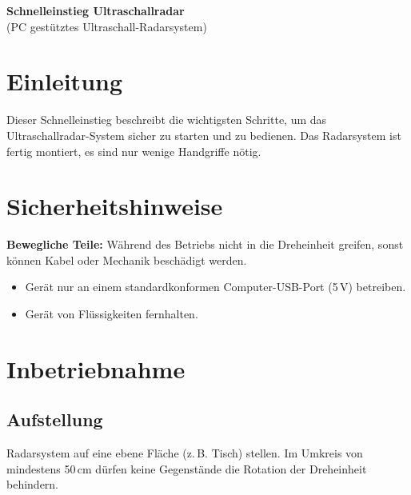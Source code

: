 \documentclass[a4paper,11pt]{article}
\begin{document}
	
	\begin{center}
		{\LARGE \textbf{Schnelleinstieg Ultraschallradar}}\\[0.5em]
		{\large (PC gestütztes Ultraschall-Radarsystem)}
	\end{center}
	
	\vspace{1em}
	
	
	\section{Einleitung}
	
	Dieser Schnelleinstieg beschreibt die wichtigsten Schritte, um das Ultraschallradar-System sicher zu starten und zu bedienen.
	Das Radarsystem ist fertig montiert, es sind nur wenige Handgriffe nötig.
	
	\section{Sicherheitshinweise}
	
	\textbf{Bewegliche Teile:} Während des Betriebs nicht in die Dreheinheit greifen, sonst können Kabel oder Mechanik beschädigt werden. 
	
	\begin{itemize}
		\item Gerät nur an einem standardkonformen Computer-USB-Port (5\,V) betreiben.
		\item Gerät von Flüssigkeiten fernhalten.
	\end{itemize}
	
	\section{Inbetriebnahme}
	
	\subsection{Aufstellung}
	
	Radarsystem auf eine ebene Fläche (z.\,B. Tisch) stellen.
	Im Umkreis von mindestens 50\,cm dürfen keine Gegenstände die Rotation der Dreheinheit behindern. 
	
\end{document}
